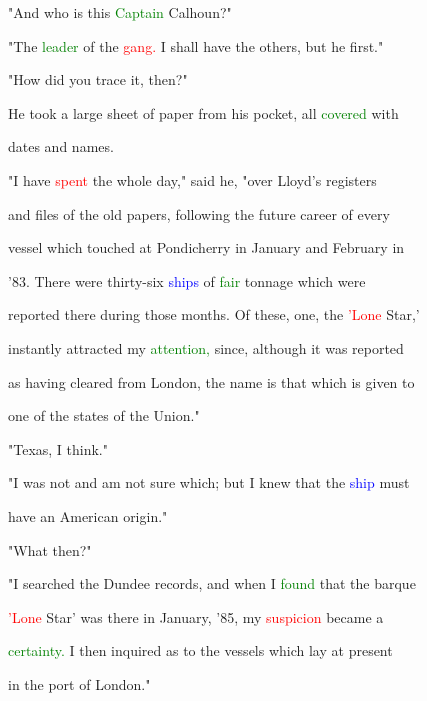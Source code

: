  "And who is this \textcolor{green}{Captain} Calhoun?"



 "The \textcolor{green}{leader} of the \textcolor{red}{gang.} I shall have the others, but he first."



 "How did you trace it, then?"



 He took a large sheet of paper from his pocket, all \textcolor{green}{covered} with

 dates and names.



 "I have \textcolor{red}{spent} the whole day," said he, "over Lloyd's registers

 and files of the old papers, following the future \textcolor{BurntOrange}{career} of every

 vessel which touched at Pondicherry in January and February in

 '83. There were thirty-six \textcolor{blue}{ships} of \textcolor{green}{fair} tonnage which were

 reported there during those months. Of these, one, the \textcolor{red}{'Lone} \textcolor{BurntOrange}{Star,'}

 instantly attracted my \textcolor{green}{attention,} since, although it was reported

 as having cleared from London, the name is that which is given to

 one of the states of the Union."



 "Texas, I think."



 "I was not and am not sure which; but I knew that the \textcolor{blue}{ship} must

 have an American origin."



 "What then?"



 "I searched the Dundee records, and when I \textcolor{green}{found} that the barque

 \textcolor{red}{'Lone} \textcolor{BurntOrange}{Star'} was there in January, '85, my \textcolor{red}{suspicion} became a

 \textcolor{green}{certainty.} I then inquired as to the vessels which lay at \textcolor{BurntOrange}{present}

 in the port of London."



